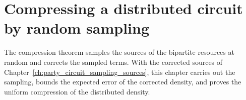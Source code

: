 \chapter{Compressing a distributed circuit by random sampling}
\label{ch:party_circuit_sampling}

The compression theorem \cite[Theorem~5.2]{OpenAI2026PolynomialPEPS} samples
the sources of the bipartite resources at random and corrects the sampled
terms. With the corrected sources of
Chapter~\ref{ch:party_circuit_sampling_sources}, this chapter carries out the
sampling, bounds the expected error of the corrected density, and proves the
uniform compression of the distributed density.











